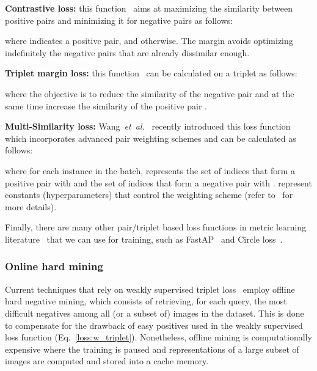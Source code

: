 \documentclass{article}
\newcommand{\etal}{\textit{et~al.}}
\begin{document}
\vspace{2pt}
\noindent\textbf{Contrastive loss:} this function~\cite{hadsell2006dimensionality} aims at maximizing the similarity between positive pairs and minimizing it for negative pairs as follows:

where  indicates a positive pair, and  otherwise. The margin  avoids optimizing indefinitely the negative pairs that are already dissimilar enough.

\vspace{2pt}
\noindent\textbf{Triplet margin loss:} this function~\cite{hoffer2015deep} can be calculated on a triplet  as follows:

where the objective is to reduce the similarity  of the negative pair  and at the same time increase the similarity  of the positive pair  .

\vspace{2pt}
\noindent \textbf{Multi-Similarity loss:} Wang~\etal~\cite{wang2019multi} recently introduced this loss function which incorporates advanced pair weighting schemes and can be calculated as follows:

where for each instance  in the batch,  represents the set of indices  that form a positive pair with  and  the set of indices   that form a negative pair with .  represent constants (hyperparameters) that control the weighting scheme (refer to~\cite{wang2019multi} for more details).

Finally, there are many other pair/triplet based loss functions in metric learning literature~\cite{musgrave2020pytorch, kaya2019deep} that we can use for training, such as FastAP~\cite{cakir2019deep} and Circle loss~\cite{sun2020circle}.



\subsubsection{Online hard mining}\label{sec:sampling}
Current techniques that rely on weakly supervised triplet loss~\cite{arandjelovic2016netvlad, kim2017learned, liu2019stochastic, warburg2020mapillary} employ offline hard negative mining, which consists of retrieving, for each query, the most difficult negatives among all (or a subset of) images in the dataset. This is done to compensate for the drawback of easy positives used in the weakly supervised loss function (Eq.~\ref{loss:w_triplet}). Nonetheless, offline mining is computationally expensive where the training is paused and representations of a large subset of images are computed and stored into a cache memory.
\end{document}

